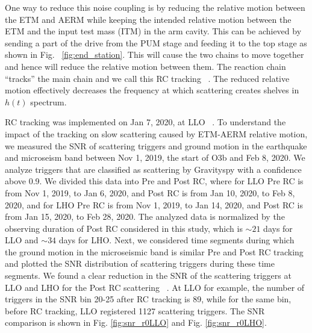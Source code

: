 \documentclass[12pt]{iopart}
\begin{document}
One way to reduce this noise coupling is by reducing the relative motion between the ETM and AERM while keeping the intended relative motion between the ETM and the input test mass (ITM) in the arm cavity. This can be achieved by sending a part of the drive from the PUM stage and feeding it to the top stage as shown in Fig. ~\ref{fig:end_station}. This will cause the two chains to move together and hence will reduce the relative motion between them. The reaction chain ``tracks'' the main chain and we call this RC tracking ~\cite{alog_robert}.
The reduced relative motion effectively decreases the frequency at which scattering creates shelves in $h(t)$ spectrum. 

RC tracking was implemented on Jan 7, 2020, at LLO ~\cite{alog_anamaria}. To understand the impact of the tracking on slow scattering caused by ETM-AERM relative motion, we measured the SNR of scattering triggers and ground motion in the earthquake and microseism band between Nov 1, 2019, the start of O3b and Feb 8, 2020. We analyze triggers that are classified as scattering by Gravityspy with a confidence above 0.9. We divided this data into Pre and Post RC, where for LLO Pre RC is from Nov 1, 2019, to Jan 6, 2020, and Post RC is from Jan 10, 2020, to Feb 8, 2020, and for LHO Pre RC is from Nov 1, 2019, to Jan 14, 2020, and Post RC is from Jan 15, 2020, to Feb 28, 2020. The analyzed data is normalized by the observing duration of Post RC considered in this study, which is $\sim 21$ days for LLO and $\sim 34$ days for LHO. Next, we considered time segments during which the ground motion in the microseismic band is similar Pre and Post RC tracking and plotted the SNR distribution of scattering triggers during these time segments. We found a clear reduction in the SNR of the scattering triggers at LLO and LHO for the Post RC scattering ~\cite{alogsid_R0}. At LLO for example, the number of triggers in the SNR bin 20-25 after RC tracking is 89, while for the same bin, before RC tracking, LLO registered 1127 scattering triggers. The SNR comparison is shown in Fig. \ref{fig:snr_r0LLO}  and Fig. \ref{fig:snr_r0LHO}.
\end{document}
